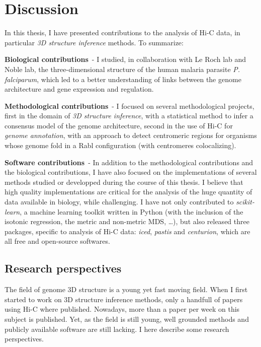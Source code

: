 
\chapter{Discussion} %

In this thesis, I have presented contributions to the analysis of Hi-C data,
in particular \textit{3D structure inference} methods. To summarize:

\textbf{Biological contributions}\ - I studied, in collaboration with Le Roch
lab and Noble lab, the three-dimensional structure of the human malaria
parasite \textit{P. falciparum}, which led to a better understanding of links
between the genome architecture and gene expression and regulation.

\textbf{Methodological contributions}\ - I focused on several methodological
projects,
first in the domain of \textit{3D structure inference}, with a statistical
method to infer a consensus model of the genome architecture, second in the
use of Hi-C for \textit{genome annotation}, with an approach to detect
centromeric regions for organisms whose genome fold in a Rabl configuration
(with centromeres colocalizing).

\textbf{Software contributions}\ - In addition to the methodological
contributions and the biological contributions, I have also focused on the
implementations of several methods studied or developped during the course of
this thesis. I believe that high quality implementations are critical for the
analysis of the huge quantity of data available in biology, while challenging.
I have not only contributed to \textit{scikit-learn}, a machine learning
toolkit written in Python (with the inclusion of
the isotonic regression, the metric and non-metric MDS, \dots), but also
released three packages, specific to analysis of Hi-C data:
\textit{iced}, \textit{pastis} and
\textit{centurion}, which are all free and open-source softwares.

\section*{Research perspectives}

The field of genome 3D structure is a young yet fast moving field. When I
first started to work on 3D structure inference methods, only a handfull of
papers using Hi-C where published. Nowadays, more than a paper per week on
this subject is published. Yet, as the field is still young, well grounded
methods and publicly available software are still lacking. I here describe
some research perspectives.


